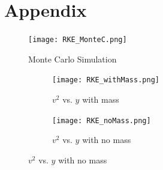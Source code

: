 \documentclass[12pt]{article}
\begin{document}
\clearpage
\section{Appendix}
\begin{figure}[H]
    \centering
    \texttt{[image: RKE\_MonteC.png]}
    \caption{Monte Carlo Simulation}
    \label{MC Plot}
\end{figure}


\begin{figure} [p]
    \begin{subfigure}
        \centering
        \texttt{[image: RKE\_withMass.png]}
        \caption{$v^2$ vs. $y$ with mass}
        \label{Massed Plot}
    \end{subfigure}
    \begin{subfigure}
        \centering
        \texttt{[image: RKE\_noMass.png]}
        \caption{$v^2$ vs. $y$ with no mass}
        \label{Massless Plot}
    \end{subfigure}
    
\end{figure}
\end{document}
